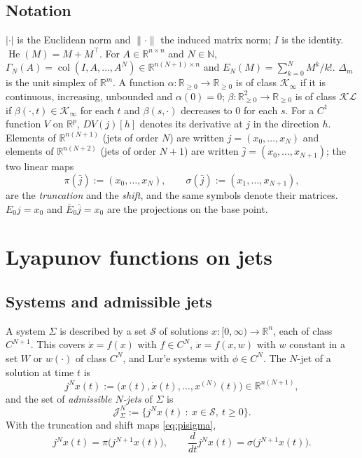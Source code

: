 \documentclass[preprint,12pt,authoryear]{elsarticle}
\theoremstyle{definition}
\theoremstyle{remark}
\newcommand{\R}{\mathbb{R}}
\newcommand{\N}{\mathbb{N}}
\newcommand{\Jet}{\mathcal{J}}
\newcommand{\tr}{^{\top}}
\newcommand{\Sol}{\mathcal{S}}
\DeclareMathOperator{\He}{He}
\DeclareMathOperator{\col}{col}
\begin{document}
\subsection{Notation}
$|\cdot|$ is the Euclidean norm and $\|\cdot\|$ the induced matrix norm; $I$ is the identity. $\He(M)=M+M\tr$. For $A\in\R^{n\times n}$ and $N\in\N$, $\Gamma_N(A)=\col(I,A,\dots,A^N)\in\R^{n(N+1)\times n}$ and $E_N(M)=\sum_{k=0}^NM^k/k!$. $\Delta_m$ is the unit simplex of $\R^m$. A function $\alpha:\R_{\ge0}\to\R_{\ge0}$ is of class $\mathcal K_\infty$ if it is continuous, increasing, unbounded and $\alpha(0)=0$; $\beta:\R_{\ge0}^2\to\R_{\ge0}$ is of class $\mathcal{KL}$ if $\beta(\cdot,t)\in\mathcal K_\infty$ for each $t$ and $\beta(s,\cdot)$ decreases to $0$ for each $s$. For a $C^1$ function $V$ on $\R^{p}$, $DV(j)[h]$ denotes its derivative at $j$ in the direction $h$. Elements of $\R^{n(N+1)}$ (jets of order $N$) are written $j=(x_0,\dots,x_N)$ and elements of $\R^{n(N+2)}$ (jets of order $N+1$) are written $\bar j=(x_0,\dots,x_{N+1})$; the two linear maps
\begin{equation}\label{eq:pisigma}
\pi(\bar j):=(x_0,\dots,x_N),\qquad \sigma(\bar j):=(x_1,\dots,x_{N+1}),
\end{equation}
are the \emph{truncation} and the \emph{shift}, and the same symbols denote their matrices. $E_0j=x_0$ and $\bar E_0\bar j=x_0$ are the projections on the base point.

\section{Lyapunov functions on jets}\label{sec:jets}

\subsection{Systems and admissible jets}
A system $\Sigma$ is described by a set $\Sol$ of solutions $x:[0,\infty)\to\R^n$, each of class $C^{N+1}$. This covers $\dot x=f(x)$ with $f\in C^N$, $\dot x=f(x,w)$ with $w$ constant in a set $W$ or $w(\cdot)$ of class $C^N$, and Lur'e systems with $\phi\in C^N$. The $N$-jet of a solution at time $t$ is
\begin{equation}\label{eq:jet}
j^Nx(t):=\big(x(t),\dot x(t),\dots,x^{(N)}(t)\big)\in\R^{n(N+1)},
\end{equation}
and the set of \emph{admissible $N$-jets} of $\Sigma$ is
\begin{equation}\label{eq:adm}
\Jet^N_\Sigma:=\big\{j^Nx(t)\ :\ x\in\Sol,\ t\ge0\big\}.
\end{equation}
With the truncation and shift maps \eqref{eq:pisigma},
\begin{equation}\label{eq:shift}
j^Nx(t)=\pi\big(j^{N+1}x(t)\big),\qquad \frac{d}{dt}j^Nx(t)=\sigma\big(j^{N+1}x(t)\big).
\end{equation}
\end{document}
